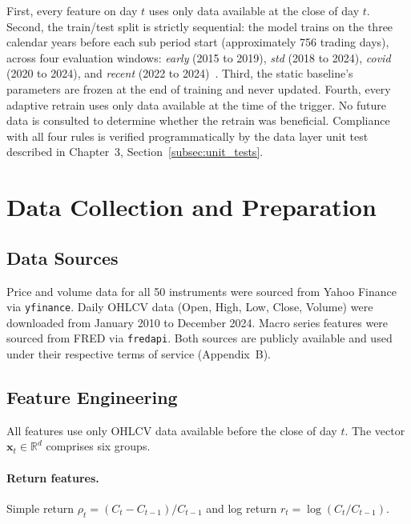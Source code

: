 First, every feature on day $t$ uses only data available at the close of day $t$. Second, the train/test split is strictly sequential: the model trains on the three calendar years before each sub period start (approximately 756 trading days), across four evaluation windows: \emph{early} (2015 to 2019), \emph{std} (2018 to 2024), \emph{covid} (2020 to 2024), and \emph{recent} (2022 to 2024)~\cite{hamilton1989,ang2012regime}. Third, the static baseline's parameters are frozen at the end of training and never updated. Fourth, every adaptive retrain uses only data available at the time of the trigger. No future data is consulted to determine whether the retrain was beneficial. Compliance with all four rules is verified programmatically by the data layer unit test described in Chapter~3, Section~\ref{subsec:unit_tests}.

\section{Data Collection and Preparation}
\label{sec:data}

\subsection{Data Sources}

Price and volume data for all 50 instruments were sourced from Yahoo Finance via \texttt{yfinance}. Daily OHLCV data (Open, High, Low, Close, Volume) were downloaded from January 2010 to December 2024. Macro series features were sourced from FRED via \texttt{fredapi}. Both sources are publicly available and used under their respective terms of service (Appendix~B).

\subsection{Feature Engineering}
\label{subsec:features}

All features use only OHLCV data available before the close of day $t$. The vector $\mathbf{x}_t \in \mathbb{R}^d$ comprises six groups.

\paragraph{Return features.}
Simple return $\rho_t = (C_t - C_{t-1})/C_{t-1}$ and log return $r_t = \log(C_t/C_{t-1})$.

